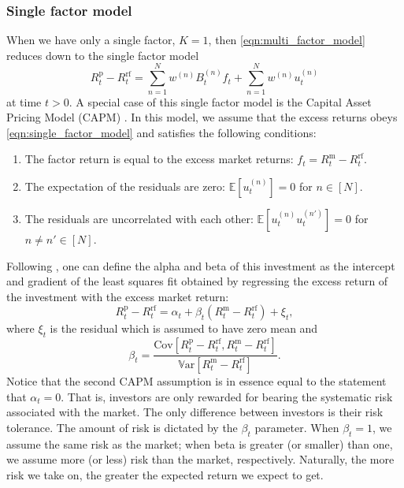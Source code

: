 \documentclass[12pt]{article}
\begin{document}
\subsubsection{Single factor model}
When we have only a single factor, $K=1$, then \eqref{eqn:multi_factor_model} reduces down to the single factor model
\begin{equation}
	R_t^{\text{p}} - R^{\text{rf}}_t = \sum_{n=1}^N w^{(n)} B_t^{(n)} f_t + \sum_{n=1}^N w^{(n)} u^{(n)}_t
	\label{eqn:single_factor_model}
\end{equation}
at time $t>0$. A special case of this single factor model is the Capital Asset Pricing Model (CAPM) \citep{sharpe1964jf}. In this model, we assume that the excess returns obeys \eqref{eqn:single_factor_model} and satisfies the following conditions:
\begin{enumerate}
	\item The factor return is equal to the excess market returns: $f_t = R^{\text{m}}_t - R^{\text{rf}}_t$.
	\item The expectation of the residuals are zero: $\mathbb{E}[u^{(n)}_t] = 0$ for $n \in [N]$.
	\item The residuals are uncorrelated with each other: $\mathbb{E}[u^{(n)}_t u^{(n')}_t] = 0$ for $n \neq n' \in [N]$.
\end{enumerate}
Following \citet[Chapter 1]{grinold1999}, one can define the alpha and beta of this investment as the intercept and gradient of the least squares fit obtained by regressing the excess return of the investment with the excess market return:
\begin{equation}
	R_t^{\text{p}} - R^{\text{rf}}_t
	= \alpha_t + \beta_t (R^{\text{m}}_t - R^{\text{rf}}_t) + \xi_t,
\end{equation}
where $\xi_t$ is the residual which is assumed to have zero mean and 
\begin{equation}
	\beta_t = \frac{\text{Cov}[R_t^{\text{p}} - R^{\text{rf}}_t, R^{\text{m}}_t - R^{\text{rf}}_t]}{ \mathbb{V}\text{ar}[R^{\text{m}}_t - R^{\text{rf}}_t]}.
\end{equation} 
Notice that the second CAPM assumption is in essence equal to the statement that $\alpha_t = 0$. That is, investors are only rewarded for bearing the systematic risk associated with the market. The only difference between investors is their risk tolerance. The amount of risk is dictated by the $\beta_t$ parameter. When $\beta_t=1$, we assume the same risk as the market; when beta is greater (or smaller) than one, we assume more (or less) risk than the market, respectively. Naturally, the more risk we take on, the greater the expected return we expect to get. 
\end{document}
